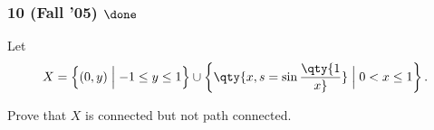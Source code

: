 \hypertarget{fall-05-done-1}{%
\subsubsection{\texorpdfstring{10 (Fall '05)
\(\done\)}{10 (Fall '05) \textbackslash done}}\label{fall-05-done-1}}

\begin{problem}[?]

Let
\begin{align*}
X = \left\{{(0, y) \mathrel{\Big|}- 1 \leq y \leq 1}\right\} \cup \left\{{\qty{x, s = \sin\qty{1 \over x}} \mathrel{\Big|}0 < x \leq 1}\right\}
.\end{align*}

Prove that \(X\) is connected but not path connected.

\end{problem}


